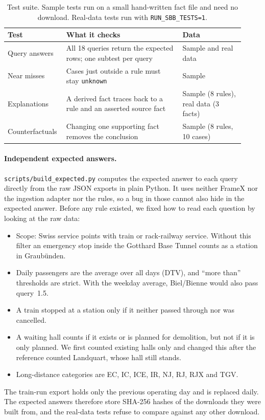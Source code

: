 \documentclass[10pt]{article}
\begin{document}
\begin{table}[h!]
\centering
\caption{Test suite. Sample tests run on a small hand-written fact file and need no download. Real-data tests run with \texttt{RUN\_SBB\_TESTS=1}.}
\label{tab:tests}
\small
\begin{tabular}{@{}p{0.2\linewidth}p{0.47\linewidth}p{0.25\linewidth}@{}}
\toprule
Test & What it checks & Data \\
\midrule
Query answers & All 18 queries return the expected rows; one subtest per query & Sample and real data \\
Near misses & Cases just outside a rule must stay \texttt{unknown} & Sample \\
Explanations & A derived fact traces back to a rule and an asserted source fact & Sample (8 rules), real data (3 facts) \\
Counterfactuals & Changing one supporting fact removes the conclusion & Sample (8 rules, 10 cases) \\
\bottomrule
\end{tabular}
\end{table}

\paragraph{Independent expected answers.}
\texttt{scripts/build\_expected.py} computes the expected answer to each query directly from the raw JSON exports in plain Python. It uses neither FrameX nor the ingestion adapter nor the rules, so a bug in those cannot also hide in the expected answer. Before any rule existed, we fixed how to read each question by looking at the raw data:
\begin{itemize}\setlength{\itemsep}{0pt}\setlength{\parskip}{0pt}
  \item Scope: Swiss service points with train or rack-railway service. Without this filter an emergency stop inside the Gotthard Base Tunnel counts as a station in Graub\"unden.
  \item Daily passengers are the average over all days (DTV), and ``more than'' thresholds are strict. With the weekday average, Biel/Bienne would also pass query~1.5.
  \item A train stopped at a station only if it neither passed through nor was cancelled.
  \item A waiting hall counts if it exists or is planned for demolition, but not if it is only planned. We first counted existing halls only and changed this after the reference counted Landquart, whose hall still stands.
  \item Long-distance categories are EC, IC, ICE, IR, NJ, RJ, RJX and TGV.
\end{itemize}
The train-run export holds only the previous operating day and is replaced daily. The expected answers therefore store SHA-256 hashes of the downloads they were built from, and the real-data tests refuse to compare against any other download.
\end{document}
